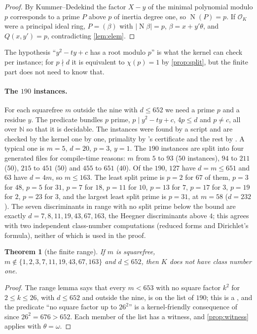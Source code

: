 \documentclass[11pt]{article}
\newtheorem{theorem}{Theorem}[section]
\theoremstyle{definition}
\newcommand{\N}{\mathbb{N}}
\newcommand{\OK}{\mathcal{O}_K}
\newcommand{\Nm}{\operatorname{N}}
\begin{document}
\begin{proof}
By Kummer--Dedekind the factor $X - y$ of the minimal polynomial modulo $p$ corresponds to a prime $P$ above $p$ of inertia degree one, so $\Nm(P) = p$. If $\OK$ were a principal ideal ring, $P = (\beta)$ with $|\Nm\beta| = p$, $\beta = x + y'\theta$, and $Q(x,y') = p$, contradicting \cref{lem:elem}.
\end{proof}

The hypothesis ``$y^2 - ty + c$ has a root modulo $p$'' is what the kernel can check per instance; for $p \nmid d$ it is equivalent to $\chi(p) = 1$ by \cref{prop:split}, but the finite part does not need to know that.

\paragraph{The $190$ instances.} For each squarefree $m$ outside the nine with $d \le 652$ we need a prime $p$ and a residue $y$. The predicate  bundles $p$ prime, $p \mid y^2 - ty + c$, $4p \le d$ and $p \ne c$, all over $\N$ so that it is decidable. The instances were found by a script and are checked by the kernel one by one, primality by 's certificate and the rest by . A typical one is $m = 5$, $d = 20$, $p = 3$, $y = 1$. The $190$ instances are split into four generated files for compile-time reasons: $m$ from $5$ to $93$ ($50$ instances), $94$ to $211$ ($50$), $215$ to $451$ ($50$) and $455$ to $651$ ($40$). Of the $190$, $127$ have $d = m \le 651$ and $63$ have $d = 4m$, so $m \le 163$. The least split prime is $p = 2$ for $67$ of them, $p = 3$ for $48$, $p = 5$ for $31$, $p = 7$ for $18$, $p = 11$ for $10$, $p = 13$ for $7$, $p = 17$ for $3$, $p = 19$ for $2$, $p = 23$ for $3$, and the largest least split prime is $p = 31$, at $m = 58$ ($d = 232$). The seven discriminants in range with no split prime below the bound are exactly $d = 7, 8, 11, 19, 43, 67, 163$, the Heegner discriminants above $4$; this agrees with two independent class-number computations (reduced forms and Dirichlet's formula), neither of which is used in the proof.

\begin{theorem}[the finite range]\label{thm:finite}
If $m$ is squarefree, $m \notin \{1, 2, 3, 7, 11, 19, 43, 67, 163\}$ and $d \le 652$, then $K$ does not have class number one.
\end{theorem}

\begin{proof}
The range lemma says that every $m < 653$ with no square factor $k^2$ for $2 \le k \le 26$, with $d \le 652$ and outside the nine, is on the list of $190$; this is a , and the predicate ``no square factor up to $26^2$'' is a kernel-friendly consequence of  since $26^2 = 676 > 652$. Each member of the list has a witness, and \cref{prop:witness} applies with $\theta = \omega$.
\end{proof}
\end{document}
